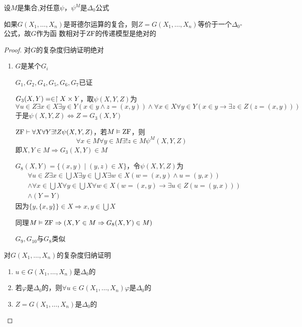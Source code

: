 \documentclass[11pt]{article}
\begin{document}
设\(M\)是集合,对任意\(\psi\)，\(\psi^M\)是\(\Delta_0\)公式

\begin{lemma}[]
如果\(G(X_1,\dots,X_n)\)是哥德尔运算的复合，则\(Z=G(X_1,\dots,X_n)\)等价于一个\(\Delta_0\)-公式，故\(G\)作为函
数相对于\(\operatorname{ZF}\)的传递模型是绝对的
\end{lemma}

\begin{proof}
对\(G\)的复杂度归纳证明绝对
\begin{enumerate}
\item \(G\)是某个\(G_i\)

\(G_1,G_2,G_4,G_5,G_6,G_7\)已证

\(G_3(X,Y)=\in\upharpoonright X\times Y\)，取\(\psi(X,Y,Z)\)为
\begin{equation*}
\forall u\in Z\exists x\in X\exists y\in Y(x\in y\wedge z=(x,y))\wedge\forall x\in X\forall y\in Y(x\in y\to\exists z\in Z(z=(x,y)))
\end{equation*}
于是\(\psi(X,Y,Z)\Leftrightarrow Z=G_3(X,Y)\)

\(\operatorname{ZF}\vdash\forall X\forall Y\exists!Z\psi(X,Y,Z)\)，若\(M\vDash\operatorname{ZF}\)，则
\begin{equation*}
\forall x\in M\forall y\in M\exists!z\in M\psi^M(X,Y,Z)
\end{equation*}
即\(X,Y\in M\Rightarrow G_3(X,Y)\in M\)

\(G_8(X,Y)=\{(x,y)\mid(y,z)\in X\}\)，令\(\psi(X,Y,Z)\)为
\begin{align*}
&\forall u\in Z\exists x\in\bigcup X\exists y\in\bigcup X\exists w\in X(w=(x,y)\wedge u=(y,x))\\
&\wedge\forall x\in\bigcup X\forall y\in\bigcup X\forall w\in X(w=(x,y)\to\exists u\in Z(u=(y,x)))\\
&\wedge(Y=Y)
\end{align*}
因为\(\{y,\{x,y\}\}\in X\Rightarrow x,y\in\bigcup X\)

同理\(M\vDash\operatorname{ZF}\Rightarrow (X,Y\in M\Rightarrow G_8(X,Y)\in M)\)

\(G_9,G_{10}\)与\(G_8\)类似
\end{enumerate}



对\(G(X_1,\dots,X_n)\)的复杂度归纳证明
\begin{enumerate}
\item \(u\in G(X_1,\dots,X_n)\)是\(\Delta_0\)的
\item 若\(\varphi\)是\(\Delta_0\)的，则\(\forall u\in G(X_1,\dots,X_n)\varphi\)是\(\Delta_0\)的
\item \(Z=G(X_1,\dots,X_n)\)是\(\Delta_0\)的
\end{enumerate}



\end{proof}
\end{document}
